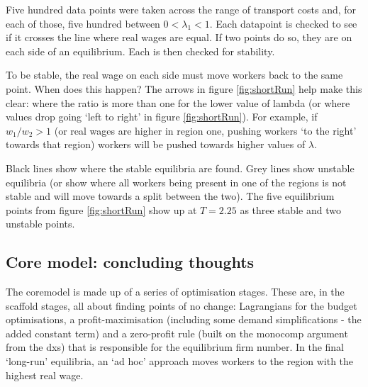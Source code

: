 {Five hundred data points were taken across the range of transport costs and, for each of those, five hundred between $0 < \lambda_1 < 1$. Each datapoint is checked to see if it crosses the line where real wages are equal. If two points do so, they are on each side of an equilibrium. Each is then checked for stability. 

To be stable, the real wage on each side must move workers back to the same point. When does this happen? The arrows in figure \ref{fig:shortRun} help make this clear: where the ratio is more than one for the lower value of lambda (or where values drop going `left to right' in figure \ref{fig:shortRun}). For example, if $w_1/w_2 > 1$ (or real wages are higher in region one,  pushing workers `to the right' towards that region) workers will be pushed towards higher values of $\lambda$.

Black lines show where the stable equilibria are found. Grey lines show unstable equilibria (or show where all workers being present in one of the regions is not stable and will move towards a split between the two). The five equilibrium points from figure \ref{fig:shortRun} show up at $T=2.25$ as three stable and two unstable points. 

\subsection{Core model: concluding thoughts}

The \gls{coremodel} is made up of a series of optimisation stages. These are, in the scaffold stages, all about finding points of no change: Lagrangians for the budget optimisations, a profit-maximisation (including some demand simplifications - the added constant term) and a zero-profit rule (built on the \gls{monocomp} argument from the \gls{dxs}) that is responsible for the equilibrium firm number. In the final `long-run' equilibria, an `ad hoc' approach moves workers to the region with the highest real wage. 

}
